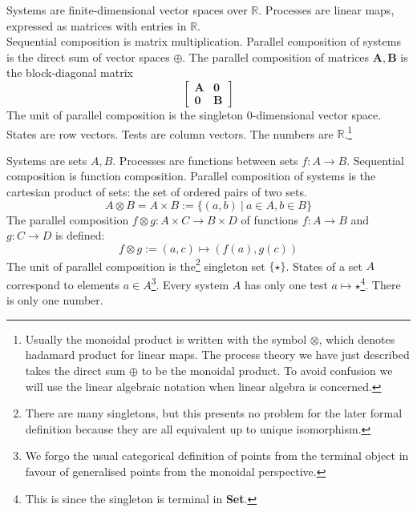 \begin{example}
Systems are finite-dimensional vector spaces over $\mathbb{R}$. Processes are linear maps, expressed as matrices with entries in $\mathbb{R}$.\\
Sequential composition is matrix multiplication. Parallel composition of systems is the direct sum of vector spaces $\oplus$. The parallel composition of matrices $\mathbf{A}, \mathbf{B}$ is the block-diagonal matrix
$$\begin{bmatrix}
\mathbf{A} & \mathbf{0} \\
\mathbf{0} & \mathbf{B}
\end{bmatrix}$$
The unit of parallel composition is the singleton 0-dimensional vector space.
States are row vectors. Tests are column vectors. The numbers are $\mathbb{R}$.\footnote{Usually the monoidal product is written with the symbol $\otimes$, which denotes hadamard product for linear maps. The process theory we have just described takes the direct sum $\oplus$ to be the monoidal product. To avoid confusion we will use the linear algebraic notation when linear algebra is concerned.}
\end{example}

\begin{example}
Systems are sets $A,B$. Processes are functions between sets $f: A \rightarrow B$. Sequential composition is function composition. Parallel composition of systems is the cartesian product of sets: the set of ordered pairs of two sets.
\[A \otimes B = A \times B := \{(a,b) \ | \ a \in A, b \in B\}\]
The parallel composition $f \otimes g : A \times C \rightarrow B \times D$ of functions $f: A \rightarrow B$ and $g: C \rightarrow D$ is defined:
\[f \otimes g := (a,c) \mapsto (f(a),g(c))\]
The unit of parallel composition is the\footnote{There are many singletons, but this presents no problem for the later formal definition because they are all equivalent up to unique isomorphism.} singleton set $\{\star\}$. States of a set $A$ correspond to elements $a \in A$\footnote{We forgo the usual categorical definition of points from the terminal object in favour of generalised points from the monoidal perspective.}. Every system $A$ has only one test $a \mapsto \star$\footnote{This is since the singleton is terminal in \textbf{Set}.}. There is only one number.
\end{example}


